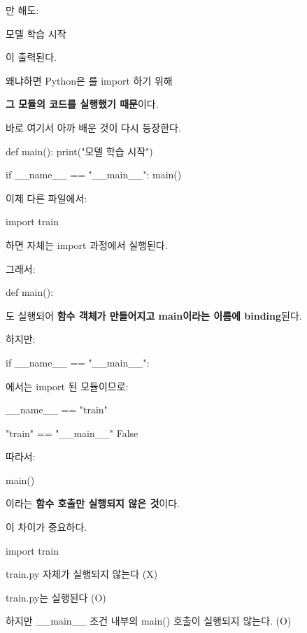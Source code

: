 만 해도:

\begin{dhkzsh}
모델 학습 시작
\end{dhkzsh}

이 출력된다.

왜냐하면 Python은 를 import 하기 위해

\textbf{그 모듈의 코드를 실행했기 때문}이다.

바로 여기서 아까 배운 것이 다시 등장한다.

\begin{dhkcode}
def main():
    print("모델 학습 시작")

if __name__ == "__main__":
    main()
\end{dhkcode}

이제 다른 파일에서:

\begin{dhkcode}
import train
\end{dhkcode}

하면  자체는 import 과정에서 실행된다.

그래서:

\begin{dhkcode}
def main():
\end{dhkcode}

도 실행되어 \textbf{함수 객체가 만들어지고 main이라는 이름에 binding}된다.

하지만:

\begin{dhkcode}
if __name__ == "__main__":
\end{dhkcode}

에서는 import 된 모듈이므로:

\begin{dhksmry}[centered]
__name__ == "train"

"train" == "__main__"
\da
False
\end{dhksmry}

따라서:

\begin{dhkcode}
main()
\end{dhkcode}

이라는 \textbf{함수 호출만 실행되지 않은 것}이다.

이 차이가 중요하다.

\begin{dhksmry}[centered]
import train

\da

train.py 자체가 실행되지 않는다 (X)

train.py는 실행된다 (O)

하지만 __main__ 조건 내부의 main() 호출이 실행되지 않는다. (O)
\end{dhksmry}

